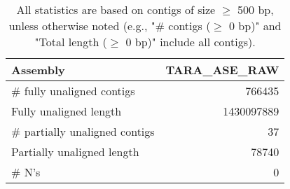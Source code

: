 \documentclass[12pt,a4paper]{article}
\begin{document}
\begin{table}[ht]
\begin{center}
\caption{All statistics are based on contigs of size $\geq$ 500 bp, unless otherwise noted (e.g., "\# contigs ($\geq$ 0 bp)" and "Total length ($\geq$ 0 bp)" include all contigs).}
\begin{tabular}{|l*{1}{|r}|}
\hline
Assembly & TARA\_ASE\_RAW \\ \hline
\# fully unaligned contigs & 766435 \\ \hline
Fully unaligned length & 1430097889 \\ \hline
\# partially unaligned contigs & 37 \\ \hline
Partially unaligned length & 78740 \\ \hline
\# N's & 0 \\ \hline
\end{tabular}
\end{center}
\end{table}
\end{document}

